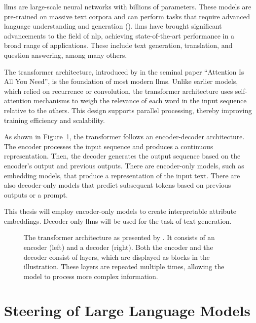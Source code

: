 \Acfp{llm} are large-scale neural networks with billions of parameters. These models are pre-trained on massive text corpora and can perform tasks that require advanced language understanding and generation (\cite{minaeeLargeLanguageModels2025}).
\acp{llm} have brought significant advancements to the field of \acl{nlp}, achieving state-of-the-art performance in a broad range of applications. These include text generation, translation, and question answering, among many others.

The transformer architecture, introduced by \citet{NIPS2017_3f5ee243} in the seminal paper \enquote{Attention Is All You Need}, is the foundation of most modern \acp{llm}. Unlike earlier models, which relied on recurrence or convolution, the transformer architecture uses self-attention mechanisms to weigh the relevance of each word in the input sequence relative to the others. This design supports parallel processing, thereby improving training efficiency and scalability.

As shown in Figure~\ref{fig:transformerArchitecture}, the transformer follows an encoder-decoder architecture. The encoder processes the input sequence and produces a continuous representation. Then, the decoder generates the output sequence based on the encoder's output and previous outputs. There are encoder-only models, such as embedding models, that produce a representation of the input text. There are also decoder-only models that predict subsequent tokens based on previous outputs or a prompt.

This thesis will employ encoder-only models to create interpretable attribute embeddings. Decoder-only \acp{llm} will be used for the task of text generation.

\begin{figure}[ht]
  \begin{center}
    \scalebox{0.95}{
      
    }
  \end{center}
  \caption{The transformer architecture as presented by \citet{NIPS2017_3f5ee243}. It consists of an encoder (left) and a decoder (right). Both the encoder and the decoder consist of layers, which are displayed as blocks in the illustration. These layers are repeated multiple times, allowing the model to process more complex information.}%
  \label{fig:transformerArchitecture}
\end{figure}

\section{Steering of Large Language Models}
\label{sec:background:llm:steering}

